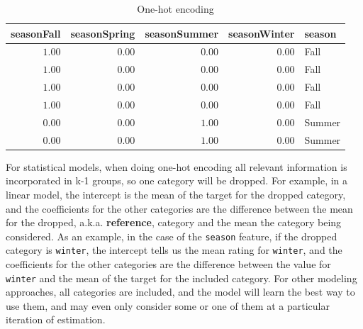 \documentclass[
  letterpaper,
]{krantz}
\begin{document}
\begin{longtable}{rrrrl}

\caption{\label{tbl-one-hot}One-hot encoding}

\tabularnewline

\toprule
seasonFall & seasonSpring & seasonSummer & seasonWinter & season \\ 
\midrule\addlinespace[2.5pt]
\textcolor[HTML]{404040}{$1.00$} & \textcolor[HTML]{404040}{$0.00$} & \textcolor[HTML]{404040}{$0.00$} & \textcolor[HTML]{404040}{$0.00$} & Fall \\ 
\textcolor[HTML]{404040}{$1.00$} & \textcolor[HTML]{404040}{$0.00$} & \textcolor[HTML]{404040}{$0.00$} & \textcolor[HTML]{404040}{$0.00$} & Fall \\ 
\textcolor[HTML]{404040}{$1.00$} & \textcolor[HTML]{404040}{$0.00$} & \textcolor[HTML]{404040}{$0.00$} & \textcolor[HTML]{404040}{$0.00$} & Fall \\ 
\textcolor[HTML]{404040}{$1.00$} & \textcolor[HTML]{404040}{$0.00$} & \textcolor[HTML]{404040}{$0.00$} & \textcolor[HTML]{404040}{$0.00$} & Fall \\ 
\textcolor[HTML]{404040}{$0.00$} & \textcolor[HTML]{404040}{$0.00$} & \textcolor[HTML]{404040}{$1.00$} & \textcolor[HTML]{404040}{$0.00$} & Summer \\ 
\textcolor[HTML]{404040}{$0.00$} & \textcolor[HTML]{404040}{$0.00$} & \textcolor[HTML]{404040}{$1.00$} & \textcolor[HTML]{404040}{$0.00$} & Summer \\ 
\bottomrule

\end{longtable}

\begin{tcolorbox}[enhanced jigsaw, colframe=quarto-callout-note-color-frame, opacityback=0, breakable, left=2mm, rightrule=.15mm, toprule=.15mm, arc=.35mm, leftrule=.75mm, colback=white, bottomrule=.15mm]

For statistical models, when doing one-hot encoding all relevant
information is incorporated in k-1 groups, so one category will be
dropped. For example, in a linear model, the intercept is the mean of
the target for the dropped category, and the coefficients for the other
categories are the difference between the mean for the dropped, a.k.a.
\textbf{reference}, category and the mean the category being considered.
As an example, in the case of the \texttt{season} feature, if the
dropped category is \texttt{winter}, the intercept tells us the mean
rating for \texttt{winter}, and the coefficients for the other
categories are the difference between the value for \texttt{winter} and
the mean of the target for the included category. For other modeling
approaches, all categories are included, and the model will learn the
best way to use them, and may even only consider some or one of them at
a particular iteration of estimation.

\end{tcolorbox}
\end{document}
